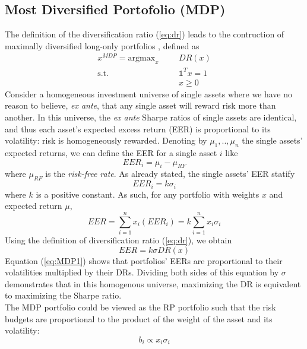 \subsection{Most Diversified Portofolio (MDP)}
The definition of the diversification ratio (\ref{eq:dr}) leads to the contruction of maximally diversified long-only portfolios \cite{diversification}, defined as
\begin{equation}
\begin{aligned}
x^{MDP} = \mbox{argmax}_x &&&DR(x)\\
\text{s.t.}&&&\mathds{1}^T x = 1\\ 
&&&x \geq 0
\end{aligned}
\end{equation}
Consider a homogeneous investment universe of single assets where we have no reason to believe, \textit{ex ante}, that any single asset will reward risk more than another. In this universe, the \textit{ex ante} Sharpe ratios of single assets are identical, and thus each asset’s expected excess return (EER) is proportional to its volatility: risk is homogeneously rewarded. Denoting by $\mu_1,..,\mu_n$ the single assets' expected returns, we can define the EER for a single asset $i$ like
\begin{equation}
EER_i = \mu_i - \mu_{RF}
\end{equation}
where $\mu_{RF}$ is the \textit{risk-free rate}. As already stated, the single assets' EER statify
\begin{equation}
EER_i = k\sigma_i
\end{equation}
where $k$ is a positive constant. As such, for any portfolio with weights $x$ and expected return $\mu$,
\begin{equation}
EER = \sum_{i=1}^{n} x_i (EER_i) = k \sum_{i=1}^n x_i \sigma_i
\end{equation}
Using the definition of diversification ratio (\ref{eq:dr}), we obtain
\begin{equation}\label{eq:MDP1}
EER = k \sigma DR(x)
\end{equation}
Equation (\ref{eq:MDP1}) shows that portfolios’ EERs are proportional to their volatilities multiplied by their DRs. Dividing both sides of this equation by $\sigma$ demonstrates that in this homogenous universe, maximizing the DR is equivalent to maximizing the Sharpe ratio.\\
The MDP portfolio could be viewed as the RP portfolio such that the risk budgets are proportional to the product of the weight of the asset and its volatility\footnotemark[2]:
\begin{equation*}
b_i \propto x_i \sigma_i
\end{equation*}
